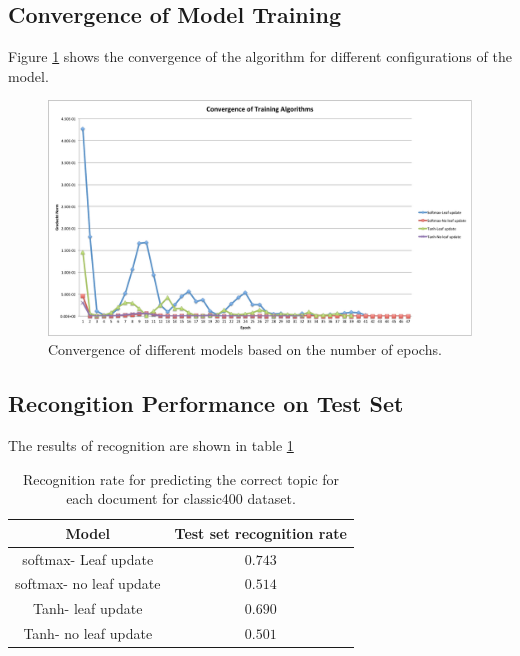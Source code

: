 \documentclass[twoside,12pt]{article}
\begin{document}
\subsection{Convergence of Model Training}
Figure \ref{figConvergence} shows the convergence of the algorithm for different configurations of the model.

\begin{figure}[ht!]
\centering
\includegraphics[width=1.\textwidth]{convergence.pdf}
\caption{Convergence of different models based on the number of epochs.}
\label{figConvergence}
\end{figure}



\subsection{Recongition Performance on Test Set}
The results of recognition are shown in table \ref{tableResults}

\begin{table}[!]
\begin{center}
\begin{tabular}{| c | c |} 
\hline
\textbf{Model}& \textbf{Test set recognition rate}  \\ \hline

softmax- Leaf update     & $0.743$ \\ \hline
softmax- no leaf update &  $0.514$ \\ \hline
Tanh- leaf update          & $0.690$ \\ \hline
Tanh- no leaf update     & $0.501$ \\ \hline
 
\end{tabular}
\caption{Recognition rate for predicting the correct topic for each document for classic400 dataset.}
\label{tableResults}
\end{center}
\end{table}
\end{document}
